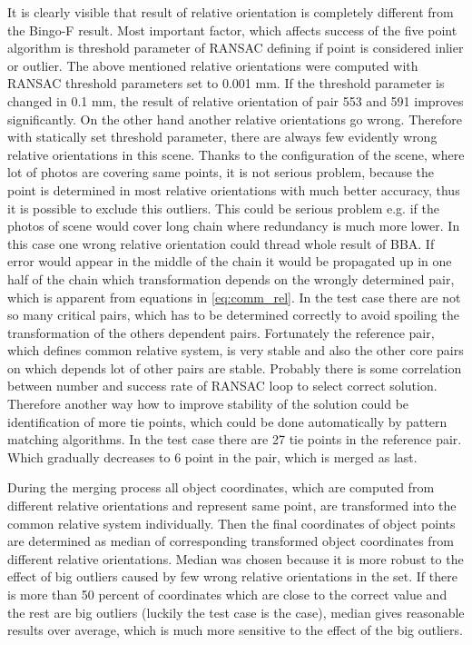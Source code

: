 \documentclass[a4paper,12pt]{article}
\begin{document}
It is clearly visible that result of relative orientation is completely different from the Bingo-F result.
Most important factor, which affects success of the five point algorithm is threshold parameter of RANSAC defining 
if point is considered inlier or outlier.
The above mentioned relative orientations were computed with RANSAC threshold parameters set to 0.001 mm.
If the threshold parameter is changed in 0.1 mm, the result of relative orientation of pair 553 and 591 improves significantly.
On the other hand another relative orientations go wrong. Therefore with statically set threshold parameter, there are always 
few evidently wrong relative orientations in this scene. Thanks to the configuration of the scene, where lot of photos are 
covering same points, it is  not serious problem, because the point is determined in most relative orientations  with 
much better accuracy, thus it is possible to exclude this outliers. This could be serious problem e.g. if the photos 
of scene would cover long chain where redundancy is much more lower.   
In this case one wrong relative orientation could thread whole result of BBA. If error would appear in the middle 
of the chain it would  be propagated up in one half of the chain which transformation depends on the wrongly
determined pair, which is apparent from equations in \eqref{eq:comm_rel}. 
In the test case there are not so many critical pairs, which has to be determined correctly to avoid spoiling the transformation 
of the others dependent pairs. Fortunately the reference pair, which defines common relative system, is very stable and also 
the other  core pairs on which depends lot of other pairs are stable. 
Probably there is some correlation between number 
and success rate of RANSAC loop to select correct solution. 
Therefore another way how to improve stability of the solution 
could be identification of more tie points, which could be done automatically by pattern matching algorithms. 
In the test case there 
are 27 tie points in the reference pair. Which gradually decreases to 6 point in the pair, which is merged as last.

During the merging process all object coordinates, which are computed from different relative orientations and represent same point, are 
transformed into  the common relative system individually. Then the final coordinates of object points are determined as median
of corresponding transformed object coordinates from different relative orientations. Median was chosen because it is more robust to the effect of 
big outliers caused by few wrong relative orientations in the set. If there is more than 50 percent of coordinates 
which are close to the correct value and the rest are big outliers (luckily the test case is the case), median gives reasonable results over average,
which is much more sensitive to the effect of the big outliers. 
\end{document}
